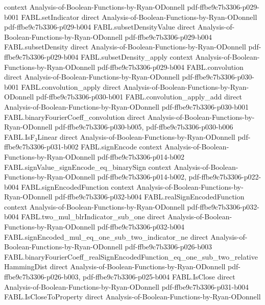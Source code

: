 \begin{theorem}
  {context}
  {Analysis-of-Boolean-Functions-by-Ryan-ODonnell}
  {pdf-ffbe9c7b3306-p029-b001}
\proofstep
  {FABL.setIndicator}
  {direct}
  {Analysis-of-Boolean-Functions-by-Ryan-ODonnell}
  {pdf-ffbe9c7b3306-p029-b004}
\proofstep
  {FABL.subsetDensityValue}
  {direct}
  {Analysis-of-Boolean-Functions-by-Ryan-ODonnell}
  {pdf-ffbe9c7b3306-p029-b004}
\proofstep
  {FABL.subsetDensity}
  {direct}
  {Analysis-of-Boolean-Functions-by-Ryan-ODonnell}
  {pdf-ffbe9c7b3306-p029-b004}
\proofstep
  {FABL.subsetDensity_apply}
  {context}
  {Analysis-of-Boolean-Functions-by-Ryan-ODonnell}
  {pdf-ffbe9c7b3306-p029-b004}
\proofstep
  {FABL.convolution}
  {direct}
  {Analysis-of-Boolean-Functions-by-Ryan-ODonnell}
  {pdf-ffbe9c7b3306-p030-b001}
\proofstep
  {FABL.convolution_apply}
  {direct}
  {Analysis-of-Boolean-Functions-by-Ryan-ODonnell}
  {pdf-ffbe9c7b3306-p030-b001}
\proofstep
  {FABL.convolution_apply_add}
  {direct}
  {Analysis-of-Boolean-Functions-by-Ryan-ODonnell}
  {pdf-ffbe9c7b3306-p030-b001}
\proofstep
  {FABL.binaryFourierCoeff_convolution}
  {direct}
  {Analysis-of-Boolean-Functions-by-Ryan-ODonnell}
  {pdf-ffbe9c7b3306-p030-b005,
    pdf-ffbe9c7b3306-p030-b006}
\proofstep
  {FABL.IsF₂Linear}
  {direct}
  {Analysis-of-Boolean-Functions-by-Ryan-ODonnell}
  {pdf-ffbe9c7b3306-p031-b002}
\proofstep
  {FABL.signEncode}
  {context}
  {Analysis-of-Boolean-Functions-by-Ryan-ODonnell}
  {pdf-ffbe9c7b3306-p014-b002}
\proofstep
  {FABL.signValue_signEncode_eq_binarySign}
  {context}
  {Analysis-of-Boolean-Functions-by-Ryan-ODonnell}
  {pdf-ffbe9c7b3306-p014-b002,
    pdf-ffbe9c7b3306-p022-b004}
\proofstep
  {FABL.signEncodedFunction}
  {context}
  {Analysis-of-Boolean-Functions-by-Ryan-ODonnell}
  {pdf-ffbe9c7b3306-p032-b004}
\proofstep
  {FABL.realSignEncodedFunction}
  {context}
  {Analysis-of-Boolean-Functions-by-Ryan-ODonnell}
  {pdf-ffbe9c7b3306-p032-b004}
\proofstep
  {FABL.two_mul_blrIndicator_sub_one}
  {direct}
  {Analysis-of-Boolean-Functions-by-Ryan-ODonnell}
  {pdf-ffbe9c7b3306-p032-b004}
\proofstep
  {FABL.signEncoded_mul_eq_one_sub_two_indicator_ne}
  {direct}
  {Analysis-of-Boolean-Functions-by-Ryan-ODonnell}
  {pdf-ffbe9c7b3306-p026-b003}
\proofstep
  {FABL.binaryFourierCoeff_realSignEncodedFunction_eq_one_sub_two_relativeHammingDist}
  {direct}
  {Analysis-of-Boolean-Functions-by-Ryan-ODonnell}
  {pdf-ffbe9c7b3306-p026-b003,
    pdf-ffbe9c7b3306-p025-b004}
\proofstep
  {FABL.IsClose}
  {direct}
  {Analysis-of-Boolean-Functions-by-Ryan-ODonnell}
  {pdf-ffbe9c7b3306-p031-b004}
\proofstep
  {FABL.IsCloseToProperty}
  {direct}
  {Analysis-of-Boolean-Functions-by-Ryan-ODonnell}

\end{theorem}

